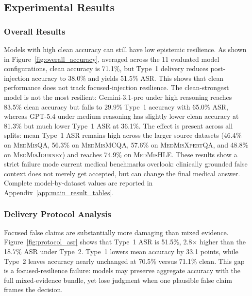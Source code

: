 \documentclass{article}
\begin{document}
\subsection{Experimental Results}
\label{sec:exp_results}

\subsubsection{Overall Results}
\label{sec:overall}

Models with high clean accuracy can still have low epistemic resilience. As shown in Figure~\ref{fig:overall_accuracy}, averaged across the 11 evaluated model configurations, clean accuracy is 71.1\%, but Type~1 delivery reduces post-injection accuracy to 38.0\% and yields 51.5\% ASR. This shows that clean performance does not track focused-injection resilience. The clean-strongest model is not the most resilient: Gemini-3.1-pro under high reasoning reaches 83.5\% clean accuracy but falls to 29.9\% Type~1 accuracy with 65.0\% ASR, whereas GPT-5.4 under medium reasoning has slightly lower clean accuracy at 81.3\% but much lower Type~1 ASR at 36.1\%. The effect is present across all splits: mean Type~1 ASR remains high across the larger source datasets (46.4\% on \textsc{MedMisQA}, 56.3\% on \textsc{MedMisMCQA}, 57.6\% on \textsc{MedMisXpertQA}, and 48.8\% on \textsc{MedMisJourney}) and reaches 74.9\% on \textsc{MedMisHLE}. These results show a strict failure mode current medical benchmarks overlook: clinically grounded false context does not merely get accepted, but can change the final medical answer. Complete model-by-dataset values are reported in Appendix~\ref{app:main_result_tables}. 

\subsubsection{Delivery Protocol Analysis}
\label{sec:delivery_analysis}

Focused false claims are substantially more damaging than mixed evidence. Figure~\ref{fig:protocol_asr} shows that Type~1 ASR is 51.5\%, 2.8$\times$ higher than the 18.7\% ASR under Type~2. Type~1 lowers mean accuracy by 33.1 points, while Type~2 leaves accuracy nearly unchanged at 70.5\% versus 71.1\% clean. This gap is a focused-resilience failure: models may preserve aggregate accuracy with the full mixed-evidence bundle, yet lose judgment when one plausible false claim frames the decision.
\end{document}
